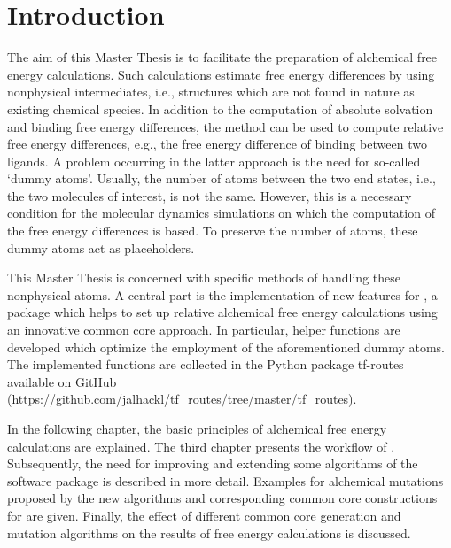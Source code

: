 \chapter{Introduction}

The aim of this Master Thesis is to facilitate the preparation of
alchemical free energy calculations. Such calculations
estimate free energy differences by using nonphysical intermediates, i.e., structures
which are not found in nature as existing chemical species. In addition
to the computation of absolute solvation and binding free energy differences,
the method can be used to compute relative free energy differences, e.g.,
the free energy difference of binding between two ligands. A problem occurring
in the latter approach is the need for so-called \textquoteleft dummy
atoms\textquoteright{}. Usually, the number of atoms between the two
end states, i.e., the two molecules of interest, is not the same.
However, this is a necessary condition for the molecular dynamics
simulations on which the computation of the free energy differences
is based. To preserve the number of atoms, these dummy atoms act as
placeholders\cite{Fleck.2021, Karwounopoulos.2022}.

This Master Thesis is concerned with specific methods of handling these nonphysical
atoms. A central part is the implementation of new features
for \trafo, a package which helps to set up relative alchemical
free energy calculations using an innovative common core approach\cite{key-2, Wieder.2022}.
In particular, helper functions are developed which optimize the employment of
the aforementioned dummy atoms. 
The implemented functions are collected in the  Python package tf-routes available on GitHub (https://github.com/jalhackl/tf\_routes/tree/master/tf\_routes).

In the following chapter, the basic principles of alchemical free energy
calculations are explained. The third chapter presents the workflow
of \trafo. Subsequently, the need for improving and extending some algorithms of the software
package is described in more detail. Examples for alchemical mutations
proposed by the new algorithms and corresponding common core constructions
for \trafo are given. Finally, the effect of different common core generation and mutation
algorithms on the results of free energy calculations is discussed.
